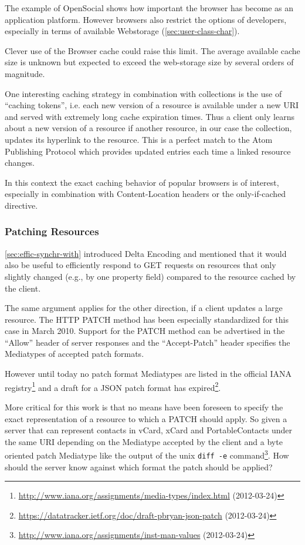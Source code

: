 \documentclass[11pt,a4paper,headsepline,twoside]{scrartcl}		%
\newcommand{\citeurl}[2]{\url{#1} (#2)}
\begin{document}
The example of OpenSocial shows how important the browser has become as an
application platform. However browsers also restrict the options of developers,
especially in terms of available Webstorage (\autoref{sec:user-class-char}).

Clever use of the Browser cache could raise this limit. The average available
cache size is unknown but expected to exceed the web-storage size by several
orders of magnitude.

One interesting caching strategy in combination with collections is the use of
``caching tokens'', i.e. each new version of a resource is available under a new
URI and served with extremely long cache expiration times. Thus a client only
learns about a new version of a resource if another resource, in our case the
collection, updates its hyperlink to the resource. This is a perfect match to
the Atom Publishing Protocol which provides updated entries each time a linked
resource changes.

In this context the exact caching behavior of popular browsers is of interest,
especially in combination with Content-Location headers or the only-if-cached
directive.

\subsubsection{Patching Resources}
\label{sec:patching-resources}

\autoref{sec:effic-synchr-with} introduced Delta Encoding \cite{RFC3229} and
mentioned that it would also be useful to efficiently respond to GET requests on
resources that only slightly changed (e.g., by one property field) compared to
the resource cached by the client.

The same argument applies for the other direction, if a client updates a large
resource. The HTTP PATCH method \cite{RFC5789} has been especially standardized
for this case in March 2010. Support for the PATCH method can be advertised in
the ``Allow'' header of server responses and the ``Accept-Patch'' header
specifies the Mediatypes of accepted patch formats.

However until today no patch format Mediatypes are listed in the official IANA
registry\footnote{\citeurl{http://www.iana.org/assignments/media-types/index.html}{2012-03-24}}
and a draft for a JSON patch format has
expired\footnote{\citeurl{https://datatracker.ietf.org/doc/draft-pbryan-json-patch}{2012-03-24}}.

More critical for this work is that no means have been foreseen to specify the
exact representation of a resource to which a PATCH should apply. So given a
server that can represent contacts in vCard, xCard and PortableContacts under
the same URI depending on the Mediatype accepted by the client and a byte
oriented patch Mediatype like the output of the unix \lstinline:diff -e:
command\footnote{\citeurl{http://www.iana.org/assignments/inst-man-values}{2012-03-24}}. How
should the server know against which format the patch should be applied?
\end{document}
